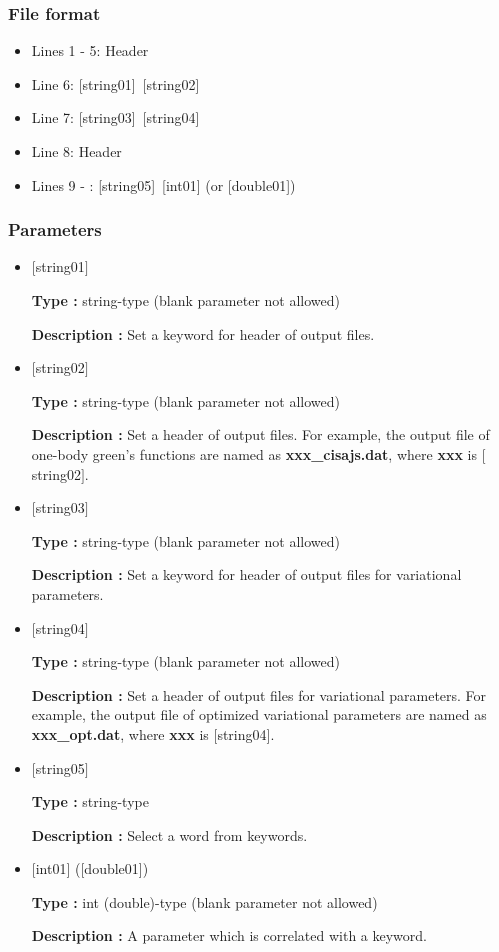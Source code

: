 \subsubsection{File format}
 \begin{itemize}
   \item  Lines 1 - 5:  Header
   \item  Line 6:  [string01]~[string02]
   \item  Line 7:  [string03]~[string04]
   \item  Line 8:  Header
   \item  Lines 9 - : [string05]~[int01] (or [double01])
  \end{itemize}

\subsubsection{Parameters}
\begin{itemize}

   \item  $[$string01$]$
   
   {\bf Type :} string-type (blank parameter not allowed)

  {\bf Description :} Set a keyword for header of output files.

   
   \item  $[$string02$]$
   
   {\bf Type :} string-type (blank parameter not allowed)

  {\bf Description :} Set a header of output files. For example, the output file of one-body green's functions are named as {\bf xxx\_cisajs.dat}, where {\bf xxx} is $[$string02$]$.

\item  $[$string03$]$
   
   {\bf Type :} string-type (blank parameter not allowed)

  {\bf Description :} Set a keyword for header of output files for variational parameters.

   
   \item  $[$string04$]$
   
   {\bf Type :} string-type (blank parameter not allowed)

  {\bf Description :} Set a header of output files for variational parameters. For example, the output file of optimized variational parameters are named as {\bf xxx\_opt.dat}, where {\bf xxx} is $[$string04$]$.

   \item  $[$string05$]$
   
   {\bf Type :} string-type

  {\bf Description :} Select a word from keywords.

   \item  $[$int01$]$ ([double01])
   
   {\bf Type :} int (double)-type (blank parameter not allowed)

  {\bf Description :} A parameter which is correlated with a keyword.
  \end{itemize}

